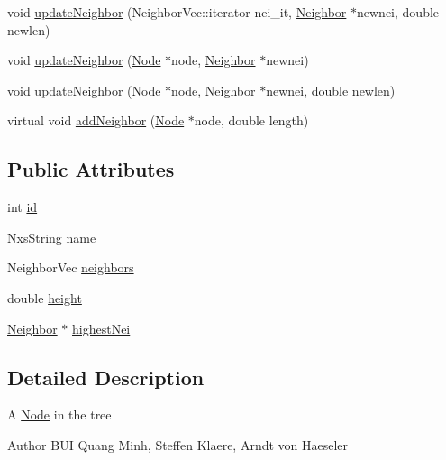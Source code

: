 \begin{DoxyCompactItemize}
\item 
void \hyperlink{classNode_a60ae4ce857e2ed5c3115060eeeec405b}{updateNeighbor} (NeighborVec::iterator nei\_\-it, \hyperlink{classNeighbor}{Neighbor} $\ast$newnei, double newlen)
\item 
void \hyperlink{classNode_a7939f3acf93cb262bfea402e7c81bc87}{updateNeighbor} (\hyperlink{classNode}{Node} $\ast$node, \hyperlink{classNeighbor}{Neighbor} $\ast$newnei)
\item 
void \hyperlink{classNode_a0994f789ab4030889f70e5b69bcc57b3}{updateNeighbor} (\hyperlink{classNode}{Node} $\ast$node, \hyperlink{classNeighbor}{Neighbor} $\ast$newnei, double newlen)
\item 
virtual void \hyperlink{classNode_abd8e9dbecc4ad76fdebefbb1b578b6f0}{addNeighbor} (\hyperlink{classNode}{Node} $\ast$node, double length)
\end{DoxyCompactItemize}
\subsection*{Public Attributes}
\begin{DoxyCompactItemize}
\item 
int \hyperlink{classNode_a59a543130a10c95f1e8642cf8c5645e8}{id}
\item 
\hyperlink{classNxsString}{NxsString} \hyperlink{classNode_a57c014f7366ed417746d92336d869510}{name}
\item 
NeighborVec \hyperlink{classNode_a35de03872f10f71851fe4c115a981d93}{neighbors}
\item 
double \hyperlink{classNode_aa0f22093957939b69e2872893ac6bccd}{height}
\item 
\hyperlink{classNeighbor}{Neighbor} $\ast$ \hyperlink{classNode_a2683e662b7577fbd5a5b78a9d2976a17}{highestNei}
\end{DoxyCompactItemize}


\subsection{Detailed Description}
A \hyperlink{classNode}{Node} in the tree \begin{DoxyAuthor}{Author}
BUI Quang Minh, Steffen Klaere, Arndt von Haeseler 
\end{DoxyAuthor}


